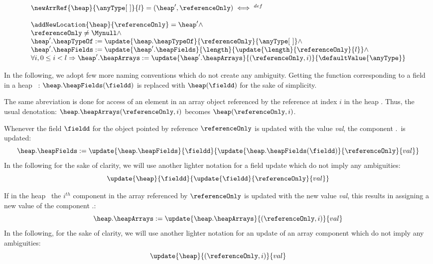  $$  \begin{array}{l}
            \newArrRef{\heap}{\anyType\lbrack \ \rbrack}{l} = (\heap', \referenceOnly)      \iff^{def} \\
	    \\
	    \addNewLocation{\heap}{\referenceOnly} = \heap' \wedge \\
	     \referenceOnly \neq \Mynull \wedge \\ 
	    \heap'.\heapTypeOf :=  \update{ \heap.\heapTypeOf}{ \referenceOnly}{\anyType\lbrack \ \rbrack  }  \wedge \\ 
            \heap'.\heapFields :=  \update{\heap'.\heapFields}{\length}{\update{\length}{ \referenceOnly}{ l }} \wedge  \\
	    \forall i, 0 \le i < l  \Rightarrow   \heap'.\heapArrays :=
            \update{\heap'.\heapArrays}{(\referenceOnly , i)}{ \defaultValue{\anyType }  } \\
	     
     \end{array} $$



In the following, we adopt few more naming conventions which do not create any ambiguity.
 Getting the function corresponding to a field \fieldd in a heap \heap \ :
$ \heap . \heapFields ( \fieldd)$ is replaced  with $ \heap  ( \fieldd)$ for the sake of simplicity.
 
The same abreviation is done for access of an element in an  array object referenced by the reference 
  at index $i$ in the heap \heap. Thus, the usual denotation:
$ \heap . \heapArrays (\referenceOnly, i )$ becomes $ \heap(\referenceOnly, i )$.
 
 




 
   Whenever the  field $\fieldd$ for the object pointed by reference
 $\referenceOnly$ is updated  with the value \textit{val},
 the component \heap.\heapFields \ is updated:
 $$ \heap.\heapFields := \update{\heap.\heapFields}{\fieldd}{\update{\heap.\heapFields(\fieldd)}{\referenceOnly}{val}} $$  
 In the following for the sake of clarity, we will use another lighter notation for a field update which do not imply any ambiguities:
 $$ 
  \update{\heap}{\fieldd}{\update{\fieldd}{\referenceOnly}{val}} 
 $$ 



 If in the heap \heap \ 
 the $i^{th}$ component in the array referenced by $\referenceOnly$ is updated with the new value \textit{val},
 this results in assigning a new value of the component \heap.\heapArrays:
 $$\heap.\heapArrays := \update{\heap.\heapArrays}{(\referenceOnly , i)}{val} $$ 
 In the following, for the sake of clarity, we will use another lighter notation for an update of an array component
 which do not imply any ambiguities:
 $$ 
  \update{\heap}{(\referenceOnly , i) }{val} 
 $$ 

 
 

